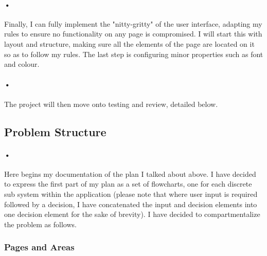 \documentclass{article}
\begin{document}
    \paragraph{•}
    Finally, I can fully implement the "nitty-gritty" of the user interface, adapting my rules to ensure no functionality on any page is compromised.
    I will start this with layout and structure, making sure all the elements of the page are located on it so as to follow my rules.
    The last step is configuring minor properties such as font and colour.
    \paragraph{•}
    The project will then move onto testing and review, detailed below.
    
    \subsection{Problem Structure}
    \paragraph{•}
    Here begins my documentation of the plan I talked about above.
    I have decided to express the first part of my plan as a set of flowcharts, one for each discrete sub system within the application (please note that where user input is required followed by a decision, I have concatenated the input and decision elements into one decision element for the sake of brevity).
    I have decided to compartmentalize the problem as follows.
    \subsubsection{Pages and Areas}
\end{document}
